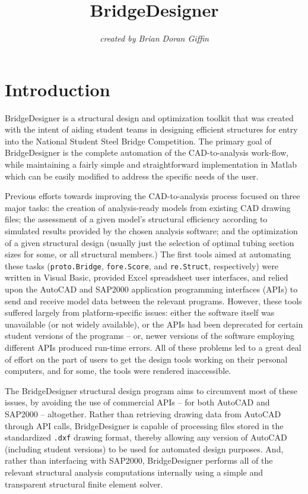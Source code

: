 \documentclass[12pt,a4paper,article]{memoir} %
\title{\textbf{BridgeDesigner}}
\author{\textit{created by Brian Doran Giffin}}
\begin{document}
\maketitle

\newpage

\tableofcontents* %

\newpage

\chapter{Introduction}

BridgeDesigner is a structural design and optimization toolkit that was created with the intent of aiding student teams in designing efficient structures for entry into the National Student Steel Bridge Competition. The primary goal of BridgeDesigner is the complete automation of the CAD-to-analysis work-flow, while maintaining a fairly simple and straightforward implementation in Matlab which can be easily modified to address the specific needs of the user.

Previous efforts towards improving the CAD-to-analysis process focused on three major tasks: the creation of analysis-ready models from existing CAD drawing files; the assessment of a given model's structural efficiency according to simulated results provided by the chosen analysis software; and the optimization of a given structural design (usually just the selection of optimal tubing section sizes for some, or all structural members.) The first tools aimed at automating these tasks (\texttt{proto.Bridge}, \texttt{fore.Score}, and \texttt{re.Struct}, respectively) were written in Visual Basic, provided Excel spreadsheet user interfaces, and relied upon the AutoCAD and SAP2000 application programming interfaces (APIs) to send and receive model data between the relevant programs. However, these tools suffered largely from platform-specific issues: either the software itself was unavailable (or not widely available), or the APIs had been deprecated for certain student versions of the programs -- or, newer versions of the software employing different APIs produced run-time errors. All of these problems led to a great deal of effort on the part of users to get the design tools working on their personal computers, and for some, the tools were rendered inaccessible.

The BridgeDesigner structural design program aims to circumvent most of these issues, by avoiding the use of commercial APIs -- for both AutoCAD and SAP2000 -- altogether. Rather than retrieving drawing data from AutoCAD through API calls, BridgeDesigner is capable of processing files stored in the standardized \texttt{.dxf} drawing format, thereby allowing any version of AutoCAD (including student versions) to be used for automated design purposes. And, rather than interfacing with SAP2000, BridgeDesigner performs all of the relevant structural analysis computations internally using a simple and transparent structural finite element solver.
\end{document}
